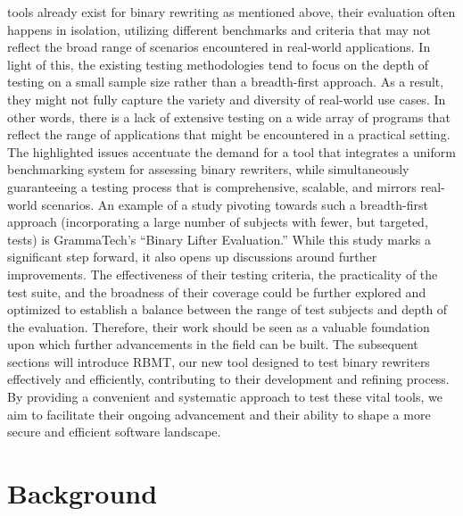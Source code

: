 \documentclass[a4paper,11pt,oneside]{report}
\begin{document}
tools already exist for binary rewriting as mentioned above, their evaluation often happens
in isolation, utilizing different benchmarks and criteria that may not reflect the broad range
of scenarios encountered in real-world applications.
In light of this, the existing testing methodologies tend to focus on the depth of
testing on a small sample size rather than a breadth-first approach. As a result, they might
not fully capture the variety and diversity of real-world use cases. In other words, there is a
lack of extensive testing on a wide array of programs that reflect the range of applications
that might be encountered in a practical setting.
The highlighted issues accentuate the demand for a tool that integrates a uniform
benchmarking system for assessing binary rewriters, while simultaneously guaranteeing a
testing process that is comprehensive, scalable, and mirrors real-world scenarios. An
example of a study pivoting towards such a breadth-first approach (incorporating a large
number of subjects with fewer, but targeted, tests) is GrammaTech’s “Binary Lifter
Evaluation.” While this study marks a significant step forward, it also opens up discussions
around further improvements. The effectiveness of their testing criteria, the practicality of
the test suite, and the broadness of their coverage could be further explored and optimized
to establish a balance between the range of test subjects and depth of the evaluation.
Therefore, their work should be seen as a valuable foundation upon which further
advancements in the field can be built.
The subsequent sections will introduce RBMT, our new tool designed to test binary
rewriters effectively and efficiently, contributing to their development and refining process.
By providing a convenient and systematic approach to test these vital tools, we aim to
facilitate their ongoing advancement and their ability to shape a more secure and efficient
software landscape.

\chapter{Background}
\end{document}
